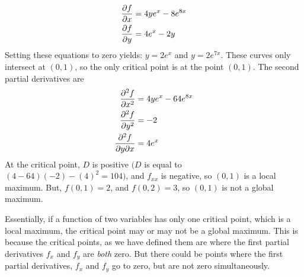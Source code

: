 \documentclass{article}
\begin{document}
\begin{enumerate}
\begin{align*}
  \frac{\partial f}{\partial x}&=4ye^x-8e^{8x}\\
  \frac{\partial f}{\partial y}&=4e^x-2y
\end{align*}
Setting these equations to zero yields: $y=2e^x$ and $y=2e^{7x}$. These curves only intersect at $(0,1)$, so the only critical point is at the point $(0,1)$. The second partial derivatives are
\begin{align*}
  \frac{\partial^2 f}{ \partial x^2}&= 4ye^x-64e^{8x}\\
  \frac{\partial^2 f}{ \partial y^2}&=-2\\
  \frac{\partial^2 f}{\partial y \partial x}&=4e^x
\end{align*}
At the critical point, $D$ is positive $\big(D$ is equal to $(4-64)(-2)-(4)^2=104\big)$, and $f_{xx}$ is negative, so $(0,1)$ is a local maximum. But, $f(0,1)=2$, and $f(0,2)=3$, so $(0,1)$ is not a global maximum. 

Essentially, if a function of two variables has only one critical point, which is a local maximum, the critical point may or may not be a global maximum. This is because the critical points, as we have defined them are where the first partial derivatives $f_x$ and $f_y$ are \textit{both} zero. But there could be points where the first partial derivatives, $f_x$ and $f_y$ go to zero, but are not zero simultaneously. 

\end{enumerate}
\end{document}
